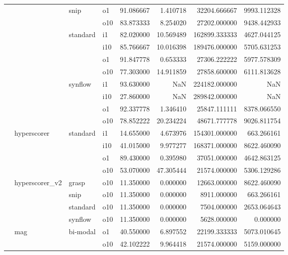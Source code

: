 \begin{longtable}{llllrrrr}
      &     & snip & o1 &  91.086667 &   1.410718 &     32204.666667 &   9993.112328 \\
      &     &         & o10 &  83.873333 &   8.254020 &     27202.000000 &   9438.442933 \\
      &     & standard & i1 &  82.020000 &  10.569489 &    162899.333333 &   4627.044125 \\
      &     &         & i10 &  85.766667 &  10.016398 &    189476.000000 &   5705.631253 \\
      &     &         & o1 &  91.847778 &   0.653333 &     27306.222222 &   5977.578309 \\
      &     &         & o10 &  77.303000 &  14.911859 &     27858.600000 &   6111.813628 \\
      &     & synflow & i1 &  93.630000 &        NaN &    224182.000000 &           NaN \\
      &     &         & i10 &  27.860000 &        NaN &    289842.000000 &           NaN \\
      &     &         & o1 &  92.337778 &   1.346410 &     25847.111111 &   8378.066550 \\
      &     &         & o10 &  78.852222 &  20.234224 &     48671.777778 &   9026.811754 \\
      & hyperscorer & standard & i1 &  14.655000 &   4.673976 &    154301.000000 &    663.266161 \\
      &     &         & i10 &  41.015000 &   9.977277 &    168371.000000 &   8622.460090 \\
      &     &         & o1 &  89.430000 &   0.395980 &     37051.000000 &   4642.863125 \\
      &     &         & o10 &  53.070000 &  47.305444 &     21574.000000 &   5306.129286 \\
      & hyperscorer\_v2 & grasp & o10 &  11.350000 &   0.000000 &     12663.000000 &   8622.460090 \\
      &     & snip & o10 &  11.350000 &   0.000000 &      8911.000000 &    663.266161 \\
      &     & standard & o10 &  11.350000 &   0.000000 &      7504.000000 &   2653.064643 \\
      &     & synflow & o10 &  11.350000 &   0.000000 &      5628.000000 &      0.000000 \\
      & mag & bi-modal & o1 &  40.550000 &   6.897552 &     22199.333333 &   5073.010645 \\
      &     &         & o10 &  42.102222 &   9.964418 &     21574.000000 &   5159.000000 \\

\end{longtable}
